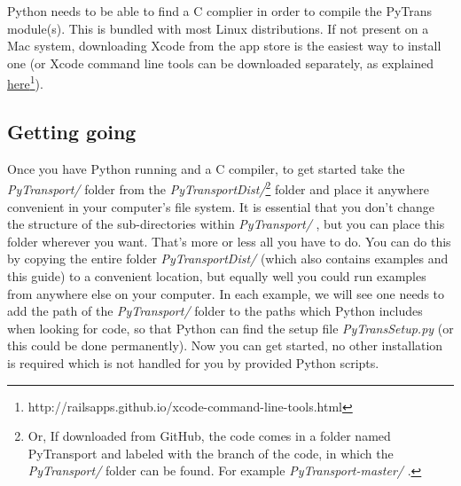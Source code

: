 \documentclass[10pt,
amsmath,amssymb,
aps,prd,nofootinbib,eqsecnum,a4paper]{revtex4}
\newcommand{\CC}{C\nolinebreak\hspace{-.05em}\raisebox{.4ex}{\tiny\bf +}\nolinebreak\hspace{-.10em}\raisebox{.4ex}{\tiny\bf +}}
\def\CC{{C\nolinebreak[4]\hspace{-.05em}\raisebox{.4ex}{\tiny\bf ++}}}
\def\S{ }
\begin{document}
\vspace{0.2cm}
\noindent {\bf \CC \S  complier:}
Python needs to be able to find a \CC \S  complier in order to compile the PyTrans module(s). This is bundled with most 
Linux distributions. If not present on a Mac system, downloading Xcode from the app store is the easiest way to 
install one (or Xcode command line tools can be downloaded separately, as explained \href{http://railsapps.github.io/xcode-command-line-tools.html}{here}\footnote{http://railsapps.github.io/xcode-command-line-tools.html}).

\subsection{Getting going}

\noindent  Once you have Python running and a \CC \S compiler, to get started take the {\it PyTransport/} folder from the 
{\it PyTransportDist/}\footnote{Or, If downloaded from GitHub, the code comes in a folder named PyTransport and labeled with the branch of the code, in which the {\it PyTransport/} folder can be found. For example {\it PyTransport-master/} .} folder and place it 
anywhere convenient in your computer's file system. It is essential that you don't change 
the structure of the sub-directories within {\it PyTransport/} , but you can place this folder wherever you want.  
That's more or less all you have to do.
You can do this by copying the entire folder {\it PyTransportDist/} (which 
also contains examples and this guide) to a convenient location, but equally well you could run examples from 
anywhere else on your computer. In each example, we will see one needs to add the path of  
the {\it PyTransport/} folder to the paths which Python includes when looking for code, so that Python can 
find the setup file 
{\it PyTransSetup.py} (or this could be done permanently). Now you can get started, no other installation is required which is not handled for you by provided 
Python scripts.
\end{document}
